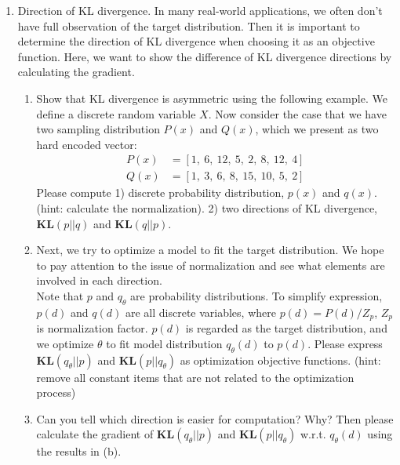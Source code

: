 \documentclass[a4paper]{article}
\begin{document}
\begin{enumerate}
\item Direction of KL divergence. In many real-world applications, we often don't have full observation of the target distribution. Then it is important to determine the direction of KL divergence when choosing it as an objective function. Here, we want to show the difference of KL divergence directions by calculating the gradient. 

\begin{enumerate}
	\item Show that KL divergence is asymmetric using the following example. We define a discrete random variable $X$. Now consider the case that we have two sampling distribution $P(x)$ and $Q(x)$, which we present as two hard encoded vector:
	\begin{align*}
		P(x) & = [1,\ 6,\ 12,\ 5,\ 2,\ 8,\ 12,\ 4]\\
		Q(x) & = [1,\ 3,\ 6,\ 8,\ 15,\ 10,\ 5,\ 2]
	\end{align*}
	Please compute 1) discrete probability distribution, $p(x)$ and $q(x)$. (hint: calculate the normalization). 2) two directions of KL divergence, \textbf{KL}$(p||q)$ and \textbf{KL}$(q||p)$.
	\item Next, we try to optimize a model to fit the target distribution. We hope to pay attention to the issue of normalization and see what elements are involved in each direction.\\
	Note that $p$ and $q_{\theta}$ are probability distributions. To simplify expression, $p(d)$ and $q(d)$ are all discrete variables, where $p(d)= P(d)/Z_p$, $Z_p$ is normalization factor. $p(d)$ is regarded as the target distribution, and we optimize $\theta$ to fit model distribution $q_{\theta}(d)$ to $p(d)$. Please express \textbf{KL}$(q_{\theta}||p)$ and  \textbf{KL}$(p||q_{\theta})$ as optimization objective functions. (hint: remove all constant items that are not related to the optimization process)\\
	
	\item Can you tell which direction is easier for computation? Why? Then please calculate the gradient of \textbf{KL}$(q_{\theta}||p)$ and  \textbf{KL}$(p||q_{\theta})$ w.r.t. $q_{\theta}(d)$ using the results in (b).

\end{enumerate}


\end{enumerate}
\end{document}
